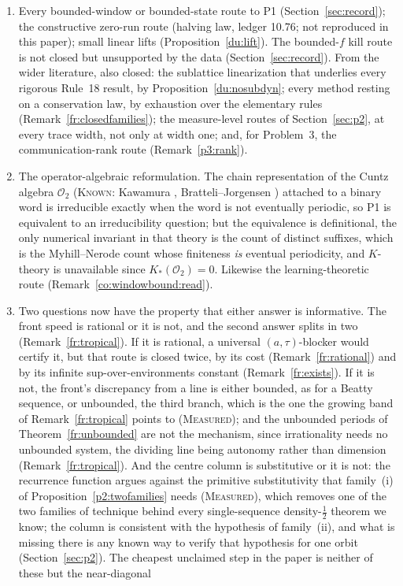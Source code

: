 \documentclass[11pt]{article}
\theoremstyle{definition}
\theoremstyle{remark}
\newcommand{\MEASURED}{\textsc{Measured}}
\newcommand{\KNOWN}{\textsc{Known}}
\begin{document}
\begin{enumerate}[nosep]
\item[Closed] Every bounded-window or bounded-state route to P1 (Section~\ref{sec:record}); the constructive zero-run route (halving law, ledger 10.76; not reproduced in this paper); small linear lifts (Proposition~\ref{du:lift}). The bounded-$f$ kill route is not closed but unsupported by the data (Section~\ref{sec:record}). From the wider literature, also closed: the sublattice linearization that underlies every rigorous Rule~18 result, by Proposition~\ref{du:nosubdyn}; every method resting on a conservation law, by exhaustion over the elementary rules (Remark~\ref{fr:closedfamilies}); the measure-level routes of Section~\ref{sec:p2}, at every trace width, not only at width one; and, for Problem~3, the communication-rank route (Remark~\ref{p3:rank}).
\item[Also closed, by equivalence] The operator-algebraic reformulation. The chain representation of the Cuntz algebra $\mathcal O_2$ (\KNOWN: Kawamura \cite{Kawamura}, Bratteli--Jorgensen \cite{BJ}) attached to a binary word is irreducible exactly when the word is not eventually periodic, so P1 is equivalent to an irreducibility question; but the equivalence is definitional, the only numerical invariant in that theory is the count of distinct suffixes, which is the Myhill--Nerode count whose finiteness \emph{is} eventual periodicity, and $K$-theory is unavailable since $K_*(\mathcal O_2)=0$. Likewise the learning-theoretic route (Remark~\ref{co:windowbound:read}).
\item[Decision points] Two questions now have the property that either answer is informative. The front speed is rational or it is not, and the second answer splits in two (Remark~\ref{fr:tropical}). If it is rational, a universal $(a,\tau)$-blocker would certify it, but that route is closed twice, by its cost (Remark~\ref{fr:rational}) and by its infinite sup-over-environments constant (Remark~\ref{fr:exists}). If it is not, the front's discrepancy from a line is either bounded, as for a Beatty sequence, or unbounded, the third branch, which is the one the growing band of Remark~\ref{fr:tropical} points to (\MEASURED); and the unbounded periods of Theorem~\ref{fr:unbounded} are not the mechanism, since irrationality needs no unbounded system, the dividing line being autonomy rather than dimension (Remark~\ref{fr:tropical}). And the centre column is substitutive or it is not: the recurrence function argues against the primitive substitutivity that family~\textup{(i)} of Proposition~\ref{p2:twofamilies} needs (\MEASURED), which removes one of the two families of technique behind every single-sequence density-$\tfrac12$ theorem we know; the column is consistent with the hypothesis of family~\textup{(ii)}, and what is missing there is any known way to verify that hypothesis for one orbit (Section~\ref{sec:p2}). The cheapest unclaimed step in the paper is neither of these but the near-diagonal

\end{enumerate}
\end{document}

